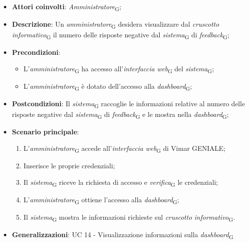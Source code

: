 \begin{itemize}
    \item \textbf{Attori coinvolti}: \textit{Amministratore}\textsubscript{G};
    \item \textbf{Descrizione}: Un \textit{amministratore}\textsubscript{G} desidera visualizzare dal \textit{cruscotto informativo}\textsubscript{G} il numero delle risposte negative dal \textit{sistema}\textsubscript{G} di \textit{feedback}\textsubscript{G};
    \item \textbf{Precondizioni}: 
        \begin{itemize}
            \item L’\textit{amministratore}\textsubscript{G} ha accesso all’\textit{interfaccia web}\textsubscript{G} del \textit{sistema}\textsubscript{G};
            \item L’\textit{amministratore}\textsubscript{G} è dotato dell’accesso alla \textit{dashboard}\textsubscript{G};
        \end{itemize}
    \item \textbf{Postcondizioni}: Il \textit{sistema}\textsubscript{G} raccoglie le informazioni relative al numero delle risposte negative dal \textit{sistema}\textsubscript{G} di \textit{feedback}\textsubscript{G} e le mostra nella \textit{dashboard}\textsubscript{G};
    \item \textbf{Scenario principale}:
    \begin{enumerate}
    \item L’\textit{amministratore}\textsubscript{G} accede all’\textit{interfaccia web}\textsubscript{G} di Vimar GENIALE;
    \item Inserisce le proprie credenziali;
    \item Il \textit{sistema}\textsubscript{G} riceve la richiesta di accesso e \textit{verifica}\textsubscript{G} le credenziali;
    \item L’\textit{amministratore}\textsubscript{G} ottiene l’accesso alla \textit{dashboard}\textsubscript{G};
    \item Il \textit{sistema}\textsubscript{G} mostra le informazioni richieste sul \textit{cruscotto informativo}\textsubscript{G}.
    \end{enumerate}
    \item \textbf{Generalizzazioni}: UC 14 - Visualizzazione informazioni sulla \textit{dashboard}\textsubscript{G}
\end{itemize}
